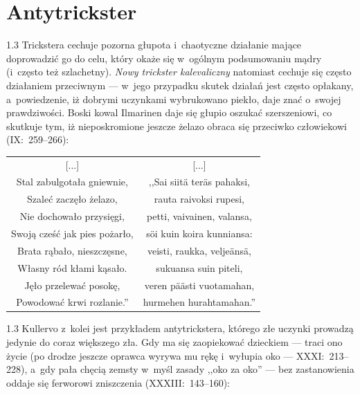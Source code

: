 \documentclass[11pt,a4paper,twoside]{report}
\begin{document}
\section{Antytrickster}
\begin{spacing}{1.3}
Trickstera cechuje pozorna głupota i~chaotyczne działanie mające doprowadzić go do celu, który okaże się w~ogólnym podsumowaniu mądry (i~często też szlachetny). \emph{Nowy trickster kalevaliczny} natomiast cechuje się często działaniem przeciwnym --- w~jego przypadku skutek działań jest często opłakany, a~powiedzenie, iż dobrymi uczynkami wybrukowano piekło, daje znać o~swojej prawdziwości. Boski kowal Ilmarinen daje się głupio oszukać szerszeniowi, co skutkuje tym, iż nieposkromione jeszcze żelazo obraca się przeciwko człowiekowi (IX:~259--266):
\end{spacing}
{\centering
\small
\begin{longtable}{c c}
{[...]} & {[...]}\\
Stal zabulgotała gniewnie, & ,,Sai siitä teräs pahaksi,\\
Szaleć zaczęło żelazo, & rauta raivoksi rupesi,\\
Nie dochowało przysięgi, & petti, vaivainen, valansa,\\
Swoją cześć jak pies pożarło, & söi kuin koira kunniansa:\\
Brata rąbało, nieszczęsne, & veisti, raukka, veljeänsä,\\
Własny ród kłami kąsało. & sukuansa suin piteli,\\
Jęło przelewać posokę, & veren päästi vuotamahan,\\
Powodować krwi rozlanie.'' & hurmehen hurahtamahan.''\\
\end{longtable}
}
\newpage
\begin{spacing}{1.3}
Kullervo z~kolei jest przykładem antytrickstera, którego złe uczynki prowadzą jedynie do coraz większego zła. Gdy ma się zaopiekować dzieckiem --- traci ono życie (po drodze jeszcze oprawca wyrywa mu rękę i~wyłupia oko --- XXXI:~213--228), a~gdy pała chęcią zemsty w~myśl zasady ,,oko za oko'' --- bez zastanowienia oddaje się ferworowi zniszczenia (XXXIII:~143--160):
\end{spacing}
\end{document}
